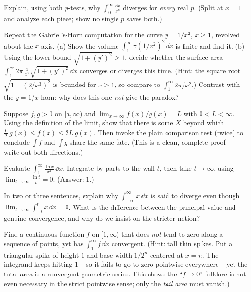 \begin{exercise}
\label{ch25:exr-both-ends}
Explain, using both $p$-tests, why $\displaystyle\int_0^{\infty}\frac{\dd x}{x^p}$
diverges for \emph{every} real $p$. (Split at $x=1$ and analyze each piece; show no
single $p$ saves both.)
\end{exercise}

\begin{exercise}
\label{ch25:exr-horn}
Repeat the Gabriel's-Horn computation for the curve $y = 1/x^2$, $x\ge 1$, revolved
about the $x$-axis.
(a) Show the volume $\int_1^\infty \pi (1/x^2)^2\,\dd x$ is finite and find it.
(b) Using the lower bound $\sqrt{1+(y')^2}\ge 1$, decide whether the surface area
$\int_1^\infty 2\pi\,\frac{1}{x^2}\sqrt{1+(y')^2}\,\dd x$ converges or diverges this
time. (Hint: the square root $\sqrt{1+(2/x^3)^2}$ is bounded for $x\ge 1$, so
compare to $\int_1^\infty 2\pi/x^2$.) Contrast with the $y=1/x$ horn: why does this
one \emph{not} give the paradox?
\end{exercise}

\begin{exercise}
\label{ch25:exr-prove-lct}
Suppose $f,g>0$ on $[a,\infty)$ and $\lim_{x\to\infty} f(x)/g(x) = L$ with
$0<L<\infty$. Using the definition of the limit, show that there is some $X$ beyond
which $\frac{L}{2}\,g(x) \le f(x) \le 2L\,g(x)$. Then invoke the plain comparison
test (twice) to conclude $\int f$ and $\int g$ share the same fate. (This is a
clean, complete proof -- write out both directions.)
\end{exercise}

\begin{exercise}
\label{ch25:exr-lhopital}
Evaluate $\displaystyle\int_1^{\infty}\frac{\ln x}{x^2}\,\dd x$. Integrate by parts
to the wall $t$, then take $t\to\infty$, using $\lim_{t\to\infty}\frac{\ln t}{t}=0$.
(Answer: $1$.)
\end{exercise}

\begin{exercise}
\label{ch25:exr-why-split}
In two or three sentences, explain why $\int_{-\infty}^{\infty} x\,\dd x$ is said to
diverge even though $\lim_{t\to\infty}\int_{-t}^{t} x\,\dd x = 0$. What is the
difference between the principal value and genuine convergence, and why do we
insist on the stricter notion?
\end{exercise}

\begin{exercise}
\label{ch25:exr-surprise}
Find a continuous function $f$ on $[1,\infty)$ that does \emph{not} tend to zero
along a sequence of points, yet has $\int_1^\infty f\,\dd x$ convergent.
(Hint: tall thin spikes. Put a triangular spike of height $1$ and base width
$1/2^n$ centered at $x=n$. The integrand keeps hitting $1$ -- so it fails to go to
zero pointwise everywhere -- yet the total area is a convergent geometric series.
This shows the ``$f\to0$'' folklore is not even necessary in the strict pointwise
sense; only the \emph{tail area} must vanish.)
\end{exercise}
